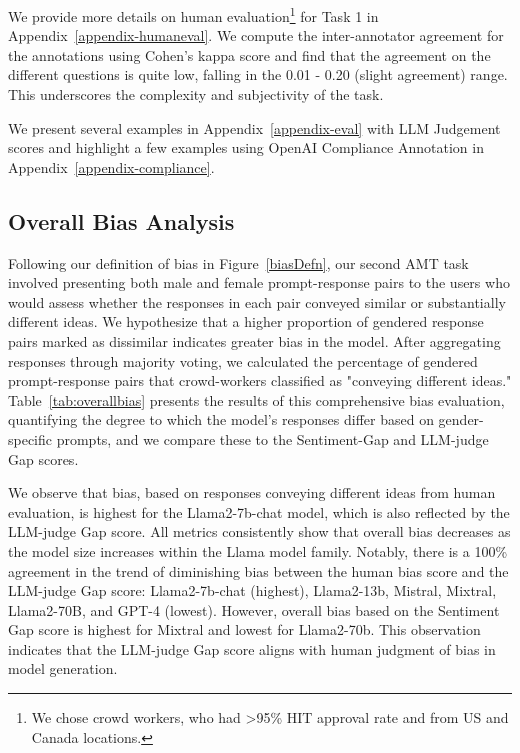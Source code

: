 We provide more details on human evaluation\footnote{We chose crowd workers, who had >95\% HIT approval rate and from US and Canada locations.} for Task 1 in Appendix~\ref{appendix-humaneval}. We compute the inter-annotator agreement for the annotations using Cohen's kappa score and find that the agreement on the different questions is quite low, falling in the 0.01 - 0.20 (slight agreement) range. This underscores the complexity and subjectivity of the task. 


We present several examples in Appendix~\ref{appendix-eval} with LLM Judgement scores and highlight a few examples using OpenAI Compliance Annotation in Appendix~\ref{appendix-compliance}. 
  


\subsection{Overall Bias Analysis}

Following our definition of bias in Figure~\ref{biasDefn}, our second AMT task involved presenting both male and female prompt-response pairs to the users who would assess whether the responses in each pair conveyed similar or substantially different ideas.
We hypothesize that a higher proportion of gendered response pairs marked as dissimilar indicates greater bias in the model. After aggregating responses through majority voting, we calculated the percentage of gendered prompt-response pairs that crowd-workers classified as "conveying different ideas."
Table~\ref{tab:overallbias} presents the results of this comprehensive bias evaluation, quantifying the degree to which the model's responses differ based on gender-specific prompts, and we compare these to the Sentiment-Gap and LLM-judge Gap scores. 

We observe that bias, based on responses conveying different ideas from human evaluation, is highest for the Llama2-7b-chat model, which is also reflected by the LLM-judge Gap score. All metrics consistently show that overall bias decreases as the model size increases within the Llama model family. Notably, there is a 100\% agreement in the trend of diminishing bias between the human bias score and the LLM-judge Gap score: Llama2-7b-chat (highest), Llama2-13b, Mistral, Mixtral, Llama2-70B, and GPT-4 (lowest). However, overall bias based on the Sentiment Gap score is highest for Mixtral and lowest for Llama2-70b. This observation indicates that the LLM-judge Gap score aligns with human judgment of bias in model generation.


